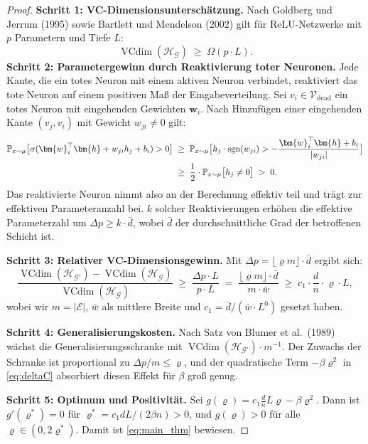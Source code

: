 ﻿\documentclass[12pt, a4paper, openany]{report}
\newcommand{\Prob}{\mathbb{P}}
\newcommand{\calG}{\mathcal{G}}
\newcommand{\calH}{\mathcal{H}}
\newcommand{\calV}{\mathcal{V}}
\newcommand{\calE}{\mathcal{E}}
\DeclareMathOperator{\sgn}{sgn}
\DeclareMathOperator{\VC}{VCdim}
\begin{document}
\begin{proof}
\textbf{Schritt 1: VC-Dimensionsunterschätzung.}
Nach Goldberg und Jerrum (1995) sowie Bartlett und Mendelson (2002) gilt
für ReLU-Netzwerke mit $p$ Parametern und Tiefe $L$:
\begin{equation}
  \label{eq:vc_base}
  \VC(\calH_{\calG}) \;\geq\; \Omega(p \cdot L).
\end{equation}
\textbf{Schritt 2: Parametergewinn durch Reaktivierung toter Neuronen.}
Jede Kante, die ein totes Neuron mit einem aktiven Neuron verbindet,
reaktiviert das tote Neuron auf einem positiven Maß der Eingabeverteilung.
Sei $v_i \in \calV_{\mathrm{dead}}$ ein totes Neuron mit eingehenden
Gewichten $\bm{w}_i$.  Nach Hinzufügen einer eingehenden Kante
$(v_j, v_i)$ mit Gewicht $w_{ji} \neq 0$ gilt:
\begin{align}
  \Prob_{x \sim \mu}\bigl[\sigma(\bm{w}_i^\top\bm{h} + w_{ji} h_j + b_i) > 0\bigr]
  &\;\geq\;
  \Prob_{x \sim \mu}\bigl[h_j \cdot \sgn(w_{ji}) > -\frac{\bm{w}_i^\top \bm{h} + b_i}{|w_{ji}|}\bigr] \notag \\
  &\;\geq\;
  \frac{1}{2} \cdot \Prob_{x \sim \mu}\bigl[h_j \neq 0\bigr]
  \;>\; 0.
\end{align}
Das reaktivierte Neuron nimmt also an der Berechnung effektiv teil und
trägt zur effektiven Parameteranzahl bei.  $k$ solcher Reaktivierungen
erhöhen die effektive Parameterzahl um $\Delta p \geq k \cdot \bar{d}$,
wobei $\bar{d}$ der durchschnittliche Grad der betroffenen Schicht ist.

\textbf{Schritt 3: Relativer VC-Dimensionsgewinn.}
Mit $\Delta p = \lfloor \varrho m \rfloor \cdot \bar{d}$ ergibt sich:
\begin{equation}
  \label{eq:vc_gain}
  \frac{\VC(\calH_{\calG'}) - \VC(\calH_{\calG})}{\VC(\calH_{\calG})}
  \;\geq\;
  \frac{\Delta p \cdot L}{p \cdot L}
  \;=\;
  \frac{\lfloor\varrho m\rfloor \cdot \bar{d}}{m \cdot \bar{w}}
  \;\geq\;
  c_1 \cdot \frac{d}{n} \cdot \varrho \cdot L,
\end{equation}
wobei wir $m = |\calE|$, $\bar{w}$ als mittlere Breite und
$c_1 = \bar{d}/(\bar{w} \cdot L^0)$ gesetzt haben.

\textbf{Schritt 4: Generalisierungskosten.}
Nach Satz von Blumer et al.\ (1989) wächst die Generalisierungsschranke
mit $\VC(\calH_{\calG'}) \cdot m^{-1}$.  Der Zuwachs der Schranke ist
proportional zu $\Delta p / m \leq \varrho$, und der quadratische Term
$-\beta\varrho^2$ in \eqref{eq:deltaC} absorbiert diesen Effekt für
$\beta$ groß genug.

\textbf{Schritt 5: Optimum und Positivität.}
Sei $g(\varrho) = c_1 \frac{d}{n} L \varrho - \beta \varrho^2$.
Dann ist $g'(\varrho^*) = 0$ für $\varrho^* = c_1 d L / (2\beta n) > 0$,
und $g(\varrho) > 0$ für alle $\varrho \in (0, 2\varrho^*)$.
Damit ist \eqref{eq:main_thm} bewiesen.
\end{proof}
\end{document}
